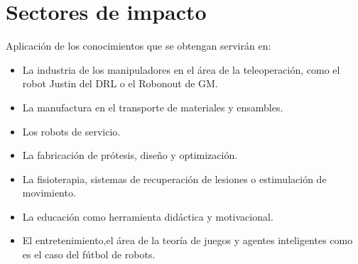 \mode*
\section[Impacto]{Sectores de impacto}
\label{sec:impacto}
Aplicaci\'on de los conocimientos que se obtengan servir\'an en: 
\begin{itemize}
\item La industria de los manipuladores en el \'area de la teleoperaci\'on, como el robot Justin del DRL o el Robonout de GM.
\item La manufactura en el transporte de materiales y ensambles.
\item Los robots de servicio.
\item La fabricaci\'on de prótesis, dise\~no y optimizaci\'on.
\item La fisioterapia, sistemas de recuperaci\'on de lesiones o estimulaci\'on de movimiento.
\item La educaci\'on como herramienta did\'actica y motivacional.
\item El entretenimiento,el área de la teor\'ia de juegos y agentes inteligentes como es el caso del fútbol de robots.
\end{itemize}

